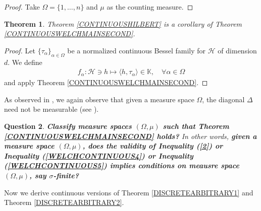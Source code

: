 \documentclass{amsart}
\newtheorem{theorem}{Theorem}[section]
\newtheorem{question}[theorem]{Question}
\begin{document}
  \begin{proof}
  	Take $\Omega=\{1,\dots,n\} $ and $\mu$ as the counting measure.
  \end{proof}
 \begin{theorem}
 Theorem 	\ref{CONTINUOUSHILBERT} is a corollary of Theorem 	\ref{CONTINUOUSWELCHMAINSECOND}.
 \end{theorem}
\begin{proof}
Let $\{\tau_\alpha\}_{\alpha\in \Omega}$ be a 	normalized continuous Bessel  family for $\mathcal{H}$ of dimension $d$. We define 
\begin{align*}
	f_\alpha:\mathcal{H}\ni h \mapsto \langle h, \tau_\alpha \rangle \in \mathbb{K}, \quad \forall \alpha \in \Omega
\end{align*}
and apply 	Theorem 	\ref{CONTINUOUSWELCHMAINSECOND}.
\end{proof} 
  As  observed in \cite{MAHESHKRISHNA}, we again observe  that given a measure space $\Omega$, the diagonal $\Delta$ need not be measurable (see \cite{DRAVECKY}).  
  \begin{question}
  	\textbf{Classify measure spaces $(\Omega, \mu) $ such that Theorem \ref{CONTINUOUSWELCHMAINSECOND}  holds?} In other words, \textbf{given a measure space $(\Omega, \mu) $, does the validity of Inequality (\ref{2}) or Inequality (\ref{WELCHCONTINUOUS4})  or Inequality (\ref{WELCHCONTINUOUS5}) implies  conditions on meausre space $(\Omega, \mu) $, say $\sigma$-finite?}
  \end{question}
 Now we derive continuous versions of Theorem   \ref{DISCRETEARBITRARY1}  and Theorem \ref{DISCRETEARBITRARY2}.
\end{document}
